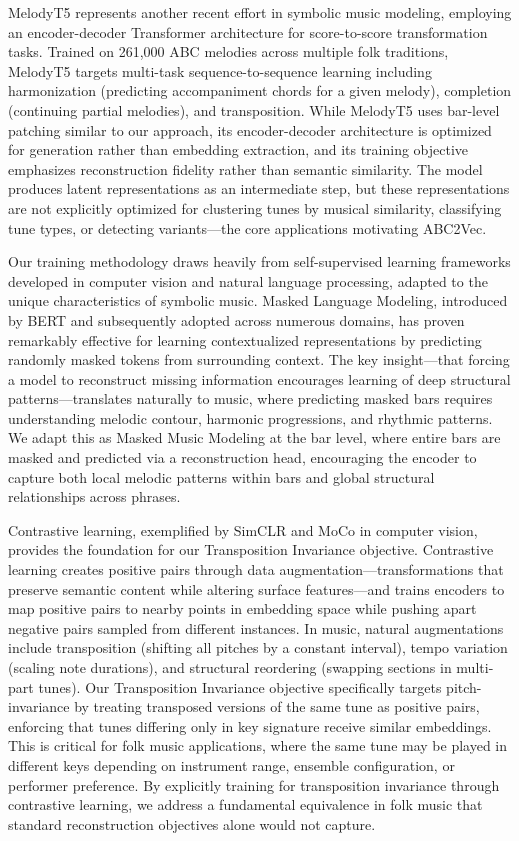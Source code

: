 \documentclass[]{interact}
\theoremstyle{plain}
\theoremstyle{definition}
\theoremstyle{remark}
\begin{document}
MelodyT5 represents another recent effort in symbolic music modeling, employing an encoder-decoder Transformer architecture for score-to-score transformation tasks. Trained on 261,000 ABC melodies across multiple folk traditions, MelodyT5 targets multi-task sequence-to-sequence learning including harmonization (predicting accompaniment chords for a given melody), completion (continuing partial melodies), and transposition. While MelodyT5 uses bar-level patching similar to our approach, its encoder-decoder architecture is optimized for generation rather than embedding extraction, and its training objective emphasizes reconstruction fidelity rather than semantic similarity. The model produces latent representations as an intermediate step, but these representations are not explicitly optimized for clustering tunes by musical similarity, classifying tune types, or detecting variants—the core applications motivating ABC2Vec.

Our training methodology draws heavily from self-supervised learning frameworks developed in computer vision and natural language processing, adapted to the unique characteristics of symbolic music. Masked Language Modeling, introduced by BERT and subsequently adopted across numerous domains, has proven remarkably effective for learning contextualized representations by predicting randomly masked tokens from surrounding context. The key insight—that forcing a model to reconstruct missing information encourages learning of deep structural patterns—translates naturally to music, where predicting masked bars requires understanding melodic contour, harmonic progressions, and rhythmic patterns. We adapt this as Masked Music Modeling at the bar level, where entire bars are masked and predicted via a reconstruction head, encouraging the encoder to capture both local melodic patterns within bars and global structural relationships across phrases.

Contrastive learning, exemplified by SimCLR and MoCo in computer vision, provides the foundation for our Transposition Invariance objective. Contrastive learning creates positive pairs through data augmentation—transformations that preserve semantic content while altering surface features—and trains encoders to map positive pairs to nearby points in embedding space while pushing apart negative pairs sampled from different instances. In music, natural augmentations include transposition (shifting all pitches by a constant interval), tempo variation (scaling note durations), and structural reordering (swapping sections in multi-part tunes). Our Transposition Invariance objective specifically targets pitch-invariance by treating transposed versions of the same tune as positive pairs, enforcing that tunes differing only in key signature receive similar embeddings. This is critical for folk music applications, where the same tune may be played in different keys depending on instrument range, ensemble configuration, or performer preference. By explicitly training for transposition invariance through contrastive learning, we address a fundamental equivalence in folk music that standard reconstruction objectives alone would not capture.
\end{document}

